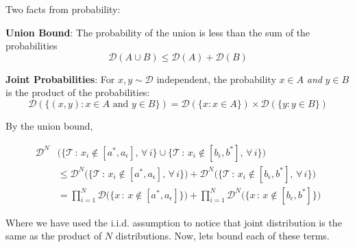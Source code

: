 \documentclass[10pt, table, handout]{beamer}
\begin{document}
\begin{frame}[fragile]{}
 \begin{minipage}[t][0.3\textheight][t]{\textwidth}
	\centering
  \end{minipage}

Two facts from probability: 

\textbf{Union Bound}: The probability of the union is less than the sum of the probabilities
$$
\mathcal{D}(A\cup B) \leq \mathcal{D}(A) + \mathcal{D}(B)
$$

\textbf{Joint Probabilities}: For $x,y\sim \mathcal{D}$ independent, the probability $x\in A$ \textit{and} $y\in B$ is the product of the probabilities:
$$
\mathcal{D}(\{(x,y): x\in A\text{ and }y\in B\} ) = \mathcal{D}(\{x: x\in A\} ) \times \mathcal{D}(\{y: y\in B\} ) 
$$
\end{frame}






\begin{frame}[fragile]{}

By the union bound, 

  \begin{minipage}[t][0.6\textheight][t]{\textwidth}
\begin{align*}
\mathcal{D}^N&\bigg(\big\{\mathcal{T}\,:\,x_i\not\in [a^*,a_\epsilon],\,\forall \,i\big\}\cup\big\{\mathcal{T}\,:\,x_i\not\in [b_\epsilon, b^*],\,\forall \,i\big\}\bigg)
\\
&\leq
\mathcal{D}^N\bigg(\big\{\mathcal{T}\,:\,x_i\not\in [a^*,a_\epsilon],\,\forall \,i\big\}\bigg)+ \mathcal{D}^N\bigg(\big\{\mathcal{T}\,:\,x_i\not\in [b_\epsilon, b^*],\,\forall \,i\big\}\bigg)
\\
&=
\prod_{i=1}^N\mathcal{D}\bigg(\big\{x\,:\,x\not\in [a^*,a_\epsilon]\big\}\bigg) + \prod_{i=1}^N \mathcal{D}^N\bigg(\big\{x\,:\,x\not\in [b_\epsilon, b^*]\big\}\bigg)
\end{align*}
  \end{minipage}
Where we have used the i.i.d. assumption to notice that joint distribution is the same as the product of $N$ distributions. Now, lets bound each of these terms. 
\end{frame}
\end{document}
